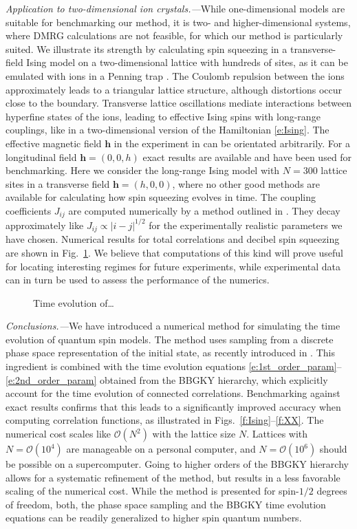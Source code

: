 \documentclass[aps,prl,showpacs,amsmath,amssymb,superscriptaddress,reprint,10pt]{revtex4-1}
\newcommand{\mvec}[1]{\boldsymbol #1}
\begin{document}
{\em Application to two-dimensional ion crystals.---}While one-dimensional models are suitable for benchmarking our method, it is two- and higher-dimensional systems, where DMRG calculations are not feasible, for which our method is particularly suited. We illustrate its strength by calculating spin squeezing in a transverse-field Ising model on a two-dimensional lattice with hundreds of sites, as it can be emulated with ions in a Penning trap \cite{Britton_etal12}. The Coulomb repulsion between the ions approximately leads to a triangular lattice structure, although distortions occur close to the boundary. Transverse lattice oscillations mediate interactions between hyperfine states of the ions, leading to effective Ising spins with long-range couplings, like in a two-dimensional version of the Hamiltonian \eqref{e:Ising}. The effective magnetic field $\mvec{h}$ in the experiment in \cite{Britton_etal12} can be orientated arbitrarily. For a longitudinal field $\mvec{h}=(0,0,h)$ exact results are available 
and have been used for benchmarking. Here we consider the long-range Ising model with $N=300$ lattice sites in a transverse field $\mvec{h}=(h,0,0)$, where no other good methods are available for calculating how spin squeezing evolves in time. The coupling coefficients $J_{ij}$ are computed numerically by a method outlined in \cite{Britton_etal12}. They decay approximately like $J_{ij}\propto|i-j|^{1/2}$ for the experimentally realistic parameters we have chosen. Numerical results for total correlations and decibel spin squeezing are shown in Fig.~\ref{f:2d}. We believe that computations of this kind will prove useful for locating interesting regimes for future experiments, while experimental data can in turn be used to assess the performance of the numerics.

\begin{figure}\centering
\caption{\label{f:2d}%
Time evolution of\dots
}%
\end{figure}


{\em Conclusions.---}We have introduced a numerical method for simulating the time evolution of quantum spin models. The method uses sampling from a discrete phase space representation of the initial state, as recently introduced in \cite{Schachenmayer_etal15}. This ingredient is combined with the time evolution equations \eqref{e:1st_order_param}--\eqref{e:2nd_order_param} obtained from the BBGKY hierarchy, which explicitly account for the time evolution of connected correlations. Benchmarking against exact results confirms that this leads to a significantly improved accuracy when computing correlation functions, as illustrated in Figs.~\ref{f:Ising}--\ref{f:XX}. The numerical cost scales like $\mathscr{O}(N^2)$ with the lattice size $N$. Lattices with $N=\mathscr{O}(10^4)$ are manageable on a personal computer, and $N=\mathscr{O}(10^6)$ should be possible on a supercomputer. Going to higher orders of the BBGKY hierarchy allows for a systematic refinement of the method, but results in a less favorable 
scaling of the numerical cost. While 
the method is presented for spin-$1/2$ degrees of freedom, both, the phase space sampling and the BBGKY time evolution equations can be readily generalized to higher spin quantum numbers.
\end{document}
